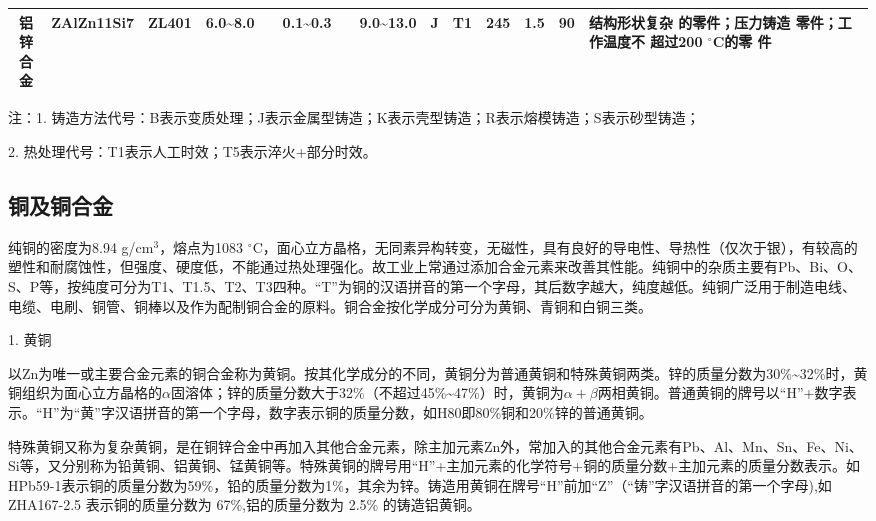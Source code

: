 \documentclass[UTF8]{ctexbook}
\newcommand{\◎}{\ensuremath{\bigcirc}}
\begin{document}
\begin{table}[H]
\begin{tabular}{|c|c|c|c|c|c|c|c|c|c|c|c|c|p{3cm}|}
\hline
\makecell{铝锌 \\ 合金} & ZAlZn11Si7 & ZL401 & 6.0\textasciitilde8.0 & & 0.1\textasciitilde0.3 & & 9.0\textasciitilde13.0 & J & T1 & 245 & 1.5 & 90 & \makecell{结构形状复杂 \\ 的零件；压力铸造 \\ 零件；工作温度不 \\ 超过200 $^\circ$C的零 \\ 件} \\
\hline
\end{tabular}
\begin{tablenotes}
	\item 注：1. 铸造方法代号：B表示变质处理；J表示金属型铸造；K表示壳型铸造；R表示熔模铸造；S表示砂型铸造；
	\item 2. 热处理代号：T1表示人工时效；T5表示淬火+部分时效。
\end{tablenotes}
\end{table}

\subsection{铜及铜合金}

纯铜的密度为8.94 g/cm$^3$，熔点为1083 $^\circ$C，面心立方晶格，无同素异构转变，无磁性，具有良好的导电性、导热性（仅次于银），有较高的塑性和耐腐蚀性，但强度、硬度低，不能通过热处理强化。故工业上常通过添加合金元素来改善其性能。纯铜中的杂质主要有Pb、Bi、O、S、P等，按纯度可分为T1、T1.5、T2、T3四种。“T”为铜的汉语拼音的第一个字母，其后数字越大，纯度越低。纯铜广泛用于制造电线、电缆、电刷、铜管、铜棒以及作为配制铜合金的原料。铜合金按化学成分可分为黄铜、青铜和白铜三类。

1. 黄铜

以Zn为唯一或主要合金元素的铜合金称为黄铜。按其化学成分的不同，黄铜分为普通黄铜和特殊黄铜两类。锌的质量分数为30\%\textasciitilde32\%时，黄铜组织为面心立方晶格的$\alpha$固溶体；锌的质量分数大于32\%（不超过45\%\textasciitilde47\%）时，黄铜为$\alpha+\beta$两相黄铜。普通黄铜的牌号以“H”+数字表示。“H”为“黄”字汉语拼音的第一个字母，数字表示铜的质量分数，如H80即80\%铜和20\%锌的普通黄铜。

特殊黄铜又称为复杂黄铜，是在铜锌合金中再加入其他合金元素，除主加元素Zn外，常加入的其他合金元素有Pb、Al、Mn、Sn、Fe、Ni、Si等，又分别称为铅黄铜、铝黄铜、锰黄铜等。特殊黄铜的牌号用“H”+主加元素的化学符号+铜的质量分数+主加元素的质量分数表示。如HPb59-1表示铜的质量分数为59\%，铅的质量分数为1\%，其余为锌。铸造用黄铜在牌号“H”前加“Z”（“铸”字汉语拼音的第一个字母),如 ZHA167-2.5 表示铜的质量分数为 67\%,铝的质量分数为 2.5\% 的铸造铝黄铜。
\end{document}
